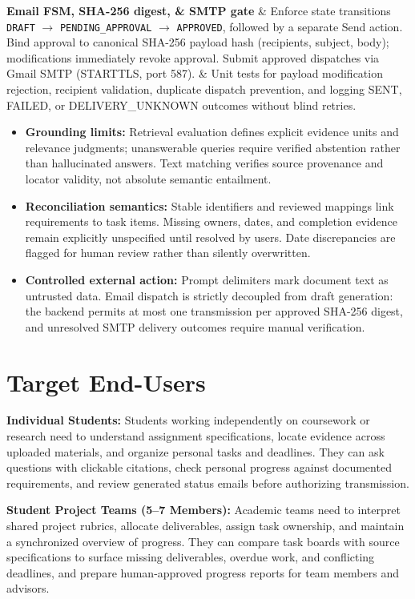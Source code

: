 \begin{longtable}
\textbf{Email FSM, SHA-256 digest, \& SMTP gate} & Enforce state transitions \texttt{DRAFT} $\rightarrow$ \texttt{PENDING\_APPROVAL} $\rightarrow$ \texttt{APPROVED}, followed by a separate Send action. Bind approval to canonical SHA-256 payload hash (recipients, subject, body); modifications immediately revoke approval. Submit approved dispatches via Gmail SMTP (STARTTLS, port 587). & Unit tests for payload modification rejection, recipient validation, duplicate dispatch prevention, and logging SENT, FAILED, or DELIVERY\_UNKNOWN outcomes without blind retries. \\ \hline
\end{longtable}
\endgroup

\begin{itemize}[leftmargin=*,itemsep=2pt]
\item \textbf{Grounding limits:} Retrieval evaluation defines explicit evidence units and relevance judgments; unanswerable queries require verified abstention rather than hallucinated answers. Text matching verifies source provenance and locator validity, not absolute semantic entailment.
\item \textbf{Reconciliation semantics:} Stable identifiers and reviewed mappings link requirements to task items. Missing owners, dates, and completion evidence remain explicitly unspecified until resolved by users. Date discrepancies are flagged for human review rather than silently overwritten.
\item \textbf{Controlled external action:} Prompt delimiters mark document text as untrusted data. Email dispatch is strictly decoupled from draft generation: the backend permits at most one transmission per approved SHA-256 digest, and unresolved SMTP delivery outcomes require manual verification.
\end{itemize}

\section{Target End-Users}

\textbf{Individual Students:} Students working independently on coursework or research need to understand assignment specifications, locate evidence across uploaded materials, and organize personal tasks and deadlines. They can ask questions with clickable citations, check personal progress against documented requirements, and review generated status emails before authorizing transmission.

\textbf{Student Project Teams (5–7 Members):} Academic teams need to interpret shared project rubrics, allocate deliverables, assign task ownership, and maintain a synchronized overview of progress. They can compare task boards with source specifications to surface missing deliverables, overdue work, and conflicting deadlines, and prepare human-approved progress reports for team members and advisors.

